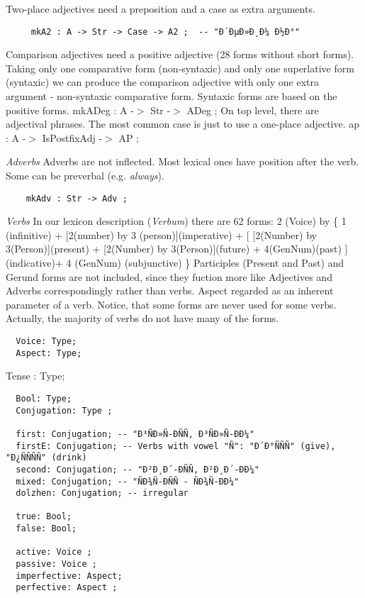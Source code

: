 \documentclass[11pt,a4paper]{article}
\newcommand{\subsubsubsection}[1]{\textit{#1}}
\begin{document}
Two-place adjectives need a preposition and a case as extra arguments.

\begin{verbatim}
     mkA2 : A -> Str -> Case -> A2 ;  -- "Ð´ÐµÐ»Ð¸Ð¼ Ð½Ð°"
\end{verbatim}

Comparison adjectives need a positive adjective 
(28 forms without short forms). 
Taking only one comparative form (non-syntaxic) and 
only one superlative form (syntaxic) we can produce the
comparison adjective with only one extra argument -
non-syntaxic comparative form.
Syntaxic forms are based on the positive forms.
mkADeg : A -$>$ Str -$>$ ADeg ;
On top level, there are adjectival phrases. The most common case is
just to use a one-place adjective. 
ap : A  -$>$ IsPostfixAdj -$>$ AP ;

\subsubsubsection{Adverbs}
Adverbs are not inflected. Most lexical ones have position
after the verb. Some can be preverbal (e.g. \textit{always}).

\begin{verbatim}
    mkAdv : Str -> Adv ;
\end{verbatim}

\subsubsubsection{Verbs}
In our lexicon description (\textit{Verbum}) there are 62 forms: 
2 (Voice) by \{ 1 (infinitive) + [2(number) by 3 (person)](imperative) + 
[ [2(Number) by 3(Person)](present) + [2(Number) by 3(Person)](future) + 
4(GenNum)(past) ](indicative)+ 4 (GenNum) (subjunctive) \} 
Participles (Present and Past) and Gerund forms are not included, 
since they fuction more like Adjectives and Adverbs correspondingly
rather than verbs. Aspect regarded as an inherent parameter of a verb.
Notice, that some forms are never used for some verbs. Actually, 
the majority of verbs do not have many of the forms.

\begin{verbatim}
  Voice: Type; 
  Aspect: Type; 
\end{verbatim}

Tense : Type;  

\begin{verbatim}
  Bool: Type;
  Conjugation: Type ;
  
  first: Conjugation; -- "Ð³ÑÐ»Ñ-ÐÑÑ, Ð³ÑÐ»Ñ-ÐÐ¼"
  firstE: Conjugation; -- Verbs with vowel "Ñ": "Ð´Ð°ÑÑÑ" (give), "Ð¿ÑÑÑÑ" (drink)  
  second: Conjugation; -- "Ð²Ð¸Ð´-ÐÑÑ, Ð²Ð¸Ð´-ÐÐ¼"
  mixed: Conjugation; -- "ÑÐ¾Ñ-ÐÑÑ - ÑÐ¾Ñ-ÐÐ¼"
  dolzhen: Conjugation; -- irregular
  
  true: Bool;
  false: Bool;
  
  active: Voice ;
  passive: Voice ;
  imperfective: Aspect;
  perfective: Aspect ;  
\end{verbatim}
\end{document}
